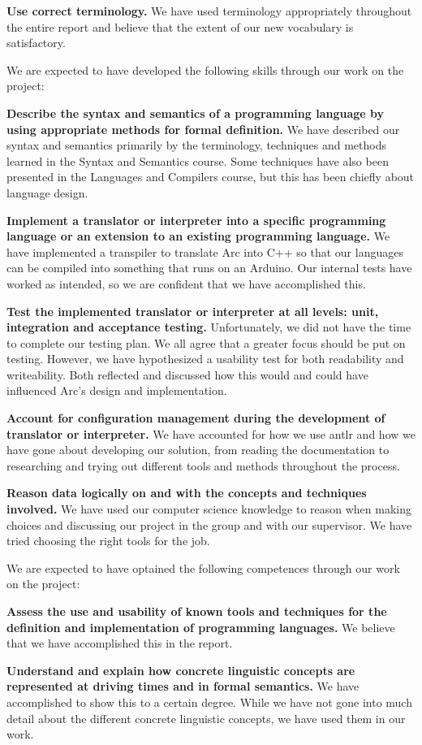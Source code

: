 \textbf{Use correct terminology.} We have used terminology appropriately throughout the entire report and believe that the extent of our new vocabulary is satisfactory.

We are expected to have developed the following skills through our work on the project:

\textbf{Describe the syntax and semantics of a programming language by using appropriate methods for formal definition.} We have described our syntax and semantics primarily by the terminology, techniques and methods learned in the Syntax and Semantics course. Some techniques have also been presented in the Languages and Compilers course, but this has been chiefly about language design.

\textbf{Implement a translator or interpreter into a specific programming language or an extension to an existing programming language.} We have implemented a transpiler to translate Arc into C++ so that our languages can be compiled into something that runs on an Arduino. Our internal tests have worked as intended, so we are confident that we have accomplished this.

\textbf{Test the implemented translator or interpreter at all levels: unit, integration and acceptance testing.} Unfortunately, we did not have the time to complete our testing plan. We all agree that a greater focus should be put on testing. However, we have hypothesized a usability test for both readability and writeability. Both reflected and discussed how this would and could have influenced Arc's design and implementation.

\textbf{Account for configuration management during the development of translator or interpreter.} We have accounted for how we use \gls{antlr} and how we have gone about developing our solution, from reading the documentation to researching and trying out different tools and methods throughout the process.

\textbf{Reason data logically on and with the concepts and techniques involved.} We have used our computer science knowledge to reason when making choices and discussing our project in the group and with our supervisor. We have tried choosing the right tools for the job.

We are expected to have optained the following competences through our work on the project:

\textbf{Assess the use and usability of known tools and techniques for the definition and implementation of programming languages.} We believe that we have accomplished this in the report.

\textbf{Understand and explain how concrete linguistic concepts are represented at driving times and in formal semantics.} We have accomplished to show this to a certain degree. While we have not gone into much detail about the different concrete linguistic concepts, we have used them in our work.